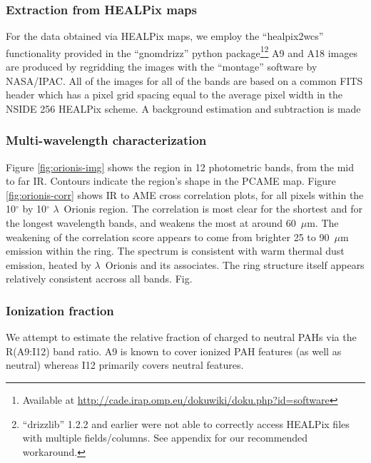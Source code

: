 		\subsubsection{Extraction from HEALPix maps}
		  For the data obtained via HEALPix maps, we employ the ``healpix2wcs'' functionality provided in the ``gnomdrizz'' python package\footnote{Available at \url{http://cade.irap.omp.eu/dokuwiki/doku.php?id=software}}\footnote{``drizzlib'' 1.2.2 and earlier were not able to correctly access HEALPix files with multiple fields/columns. See appendix for our recommended workaround.} A9 and A18 images are produced by regridding the images with the ``montage'' software by NASA/IPAC. All of the images for all of the bands are based on a common FITS header which has a pixel grid spacing equal to the average pixel width in the NSIDE 256 HEALPix scheme.
      A background estimation and subtraction is made

		\subsubsection{Multi-wavelength characterization}
			Figure \ref{fig:orionis-img} shows the region in 12 photometric bands, from the mid to far IR. Contours indicate the region's shape in the PCAME map. Figure \ref{fig:orionis-corr} shows IR to AME cross correlation plots, for all pixels within the 10$^{\circ}$ by 10$^{\circ}$ $\lambda$~Orionis region. The correlation is most clear for the shortest and for the longest wavelength bands, and weakens the most at around 60~$\mu$m. The weakening of the correlation score appears to come from brighter 25 to 90~$\mu$m emission within the ring. The spectrum is consistent with warm thermal dust emission, heated by $\lambda$~Orionis and its associates. The ring structure itself appears relatively consistent accross all bands. Fig. \

		\subsubsection{Ionization fraction}
			We attempt to estimate the relative fraction of charged to neutral PAHs via the R(A9:I12) band ratio. A9 is known to cover ionized PAH features (as well as neutral) whereas I12 primarily covers neutral features.


